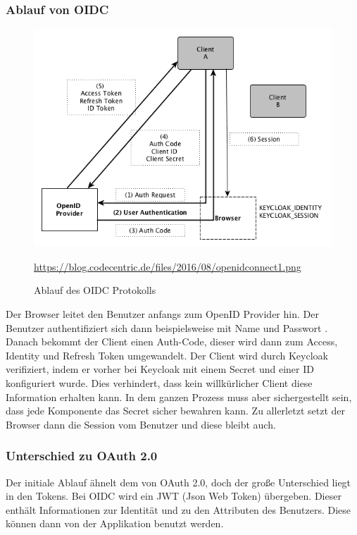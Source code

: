 \subsubsection{Ablauf von OIDC}
\begin{figure}[htp]
    \centering
    \includegraphics[scale=0.6]{pics/Ablauf_OIDC.png}
    \caption{Ablauf des OIDC Protokolls}
    \small \url{https://blog.codecentric.de/files/2016/08/openidconnect1.png} 
    \label{fig:impl:OIDCProtocoll}
\end{figure}

Der Browser leitet den Benutzer anfangs zum OpenID Provider hin. Der Benutzer authentifiziert sich dann beispielsweise mit Name und Passwort .
Danach bekommt der Client einen Auth-Code, dieser wird dann zum Access, Identity und Refresh Token umgewandelt.
Der Client wird durch Keycloak verifiziert, indem er vorher bei Keycloak mit einem Secret und einer ID konfiguriert wurde. Dies verhindert, dass kein willkürlicher Client diese Information erhalten kann.
In dem ganzen Prozess muss aber sichergestellt sein, dass jede Komponente das Secret sicher bewahren kann.
Zu allerletzt setzt der Browser dann die Session vom Benutzer und diese bleibt auch. \cite{KeycloakCodeCentric}

\subsubsection{Unterschied zu OAuth 2.0}
Der initiale Ablauf ähnelt dem von OAuth 2.0, doch der große Unterschied liegt in den Tokens.
Bei OIDC wird ein JWT (Json Web Token) übergeben. Dieser enthält Informationen zur Identität und zu den Attributen des Benutzers.
Diese können dann von der Applikation benutzt werden. \cite{KeycloakCodeCentric}


